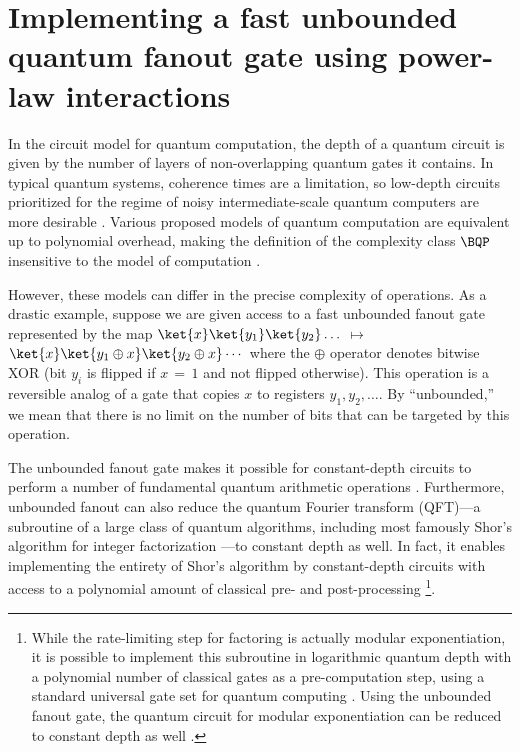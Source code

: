 \chapter{Implementing a fast unbounded quantum fanout gate using power-law interactions}
In the circuit model for quantum computation, the depth of a quantum circuit is given by the number of layers of non-overlapping quantum gates it contains.
In typical quantum systems, coherence times are a limitation, so low-depth circuits prioritized for the regime of noisy intermediate-scale quantum computers are more desirable \cite{Preskill2018}.
Various proposed models of quantum computation are equivalent up to polynomial overhead, making the definition of the complexity class $\BQP$ insensitive to the model of computation \cite{Bernstein1993,Raussendorf2001,Raussendorf2003,Hoyer2005}.

However, these models can differ in the precise complexity of operations.
As a drastic example, suppose we are given access to a fast unbounded fanout gate
represented by the map
$\ket{x} \ket{y_1} \ket{y_2} \dots$\,$\mapsto$\,$\ket{x}\ket{y_1 \oplus x} \ket{y_2 \oplus x} \cdots$
where the $\oplus$ operator denotes bitwise XOR (bit $y_i$ is flipped if $x$\,$=$\,$1$ and not flipped otherwise). This operation is a reversible analog of a gate that copies $x$ to registers $y_1, y_2, \dots$.
By ``unbounded,'' we mean that there is no limit on the number of bits that can be targeted by this operation.

The unbounded fanout gate makes it possible for constant-depth circuits to perform a number of fundamental quantum arithmetic operations \cite{Hoyer2005}.
Furthermore, unbounded fanout can also reduce the quantum Fourier transform (QFT)---a subroutine of a large class of quantum algorithms, including most famously Shor’s algorithm for integer factorization \cite{Shor1997}---to constant depth as well.
In fact, it enables implementing the entirety of Shor's algorithm by constant-depth circuits with access to a polynomial amount of classical pre- and post-processing \footnote{While the rate-limiting step for factoring is actually modular exponentiation, it is possible to implement this subroutine in logarithmic quantum depth with a polynomial number of classical gates as a pre-computation step, using a standard universal gate set for quantum computing \cite{Cleve2000}. Using the unbounded fanout gate, the quantum circuit for modular exponentiation can be reduced to constant depth as well \cite{Hoyer2005}.}.

